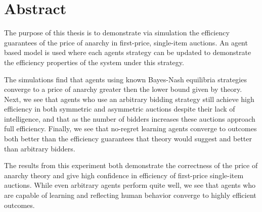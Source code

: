 \documentclass[12pt,twoside]{reedthesis}
\begin{document}
	
	

%
	

    \tableofcontents

    \chapter*{Abstract}
    
    The purpose of this thesis is to demonstrate via simulation the efficiency guarantees of the price of anarchy in first-price, single-item auctions. An agent based model is used where each agents strategy can be updated to demonstrate the efficiency properties of the system under this strategy. 
    
    The simulations find that agents using known Bayes-Nash equilibria strategies converge to a price of anarchy greater then the lower bound given by theory. Next, we see that agents who use an arbitrary bidding strategy still achieve high efficiency in both symmetric and asymmetric auctions despite their lack of intelligence, and that as the number of bidders increases these auctions approach full efficiency. Finally, we see that no-regret learning agents converge to outcomes both better than the efficiency guarantees that theory would suggest and better than arbitrary bidders. 
    
    The results from this experiment both demonstrate the correctness of the price of anarchy theory and give high confidence in efficiency of first-price single-item auctions. While even arbitrary agents perform quite well, we see that agents who are capable of learning and reflecting human behavior converge to highly efficient outcomes. 
	
\end{document}
